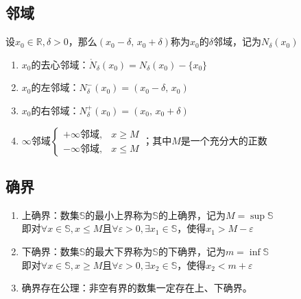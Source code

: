 \documentclass[11pt,fleqn]{book} %
\begin{document}
\subsection{邻域}
设$x_0\in \mathds{R}, \delta>0$，那么$(x_0-\delta,\,x_0+\delta)$称为$x_0$的$\delta$邻域，记为$N_{\delta}(x_0)$
\begin{enumerate}
  \item $x_0$的去心邻域：$\mathring{N}_\delta(x_0)=N_{\delta}(x_0)-\{x_0\}$
  \item $x_0$的左邻域：$N_{\delta}^-(x_0)=(x_0-\delta,\,x_0)$
  \item $x_0$的右邻域：$N_{\delta}^+(x_0)=(x_0,\,x_0+\delta)$
  \item $\infty$邻域$\left\{
                    \begin{array}{ll}
                      +\infty\text{邻域}, & x\geqslant M \\
                      -\infty\text{邻域}, & x\leqslant M
                    \end{array}
                  \right.$；其中$M$是一个充分大的正数
\end{enumerate}
\subsection{确界}
\begin{enumerate}
  \item 上确界：数集$\mathds{S}$的最小上界称为$\mathds{S}$的上确界，记为$M = \sup\mathds{S}$\\
    即对$\forall x \in \mathds{S}, x \leqslant M$且$\forall \varepsilon>0, \exists x_1 \in \mathds{S}$，使得$x_1>M-\varepsilon$
  \item 下确界：数集$\mathds{S}$的最大下界称为$\mathds{S}$的下确界，记为$m = \inf\mathds{S}$\\
    即对$\forall x \in \mathds{S}, x \geqslant M$且$\forall \varepsilon>0, \exists x_2 \in \mathds{S}$，使得$x_2<m+\varepsilon$
  \item 确界存在公理：非空有界的数集一定存在上、下确界。
\end{enumerate}
\end{document}

